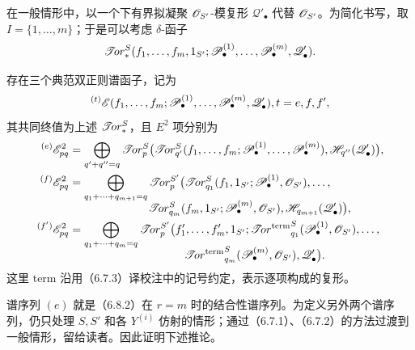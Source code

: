 在一般情形中，以一个下有界拟凝聚 $\mathscr O_{S'}$-模复形 $\mathscr Q'_\bullet$ 代替 $\mathscr O_{S'}$。为简化书写，取 $I=\{1,\ldots,m\}$；于是可以考虑 $\delta$-函子
\[
 \mathscr{T}\!or_*^S(f_1,\ldots,f_m,1_{S'};
         \mathscr P^{(1)}_\bullet,\ldots,\mathscr P^{(m)}_\bullet,\mathscr Q'_\bullet).
\]

存在三个典范双正则谱函子，记为
\[
 {}^{(t)}\mathscr E(f_1,\ldots,f_m;
       \mathscr P^{(1)}_\bullet,\ldots,\mathscr P^{(m)}_\bullet,\mathscr Q'_\bullet),
  t=e,f,f',
\]
其共同终值为上述 $\mathscr{T}\!or_*^S$，且 $E^2$ 项分别为
\begin{align*}
 {}^{(e)}\spE^2_{pq}
 &=\bigoplus_{q'+q''=q}\lTor_p^S\bigl(
   \lTor_{q'}^S(f_1,\ldots,f_m;
       \mathscr P^{(1)}_\bullet,\ldots,\mathscr P^{(m)}_\bullet),
       \HH_{q''}(\mathscr Q'_\bullet)\bigr),\\
 {}^{(f)}\spE^2_{pq}
 &=\bigoplus_{q_1+\cdots+q_{m+1}=q}\lTor_p^{S'}\bigl(
   \lTor_{q_1}^S(f_1,1_{S'};\mathscr P^{(1)}_\bullet,\OO_{S'}),\ldots,\\[-.6em]
 &\hspace{7em}\lTor_{q_m}^S(f_m,1_{S'};\mathscr P^{(m)}_\bullet,\OO_{S'}),
      \HH_{q_{m+1}}(\mathscr Q'_\bullet)\bigr),\\
 {}^{(f')}\spE^2_{pq}
 &=\bigoplus_{q_1+\cdots+q_m=q}\lTor_p^{S'}\bigl(
  f'_1,\ldots,f'_m,1_{S'};
  \termTor_{q_1}^{S}(\mathscr P^{(1)}_\bullet,\OO_{S'}),\ldots,\\[-.6em]
 &\hspace{10em}\termTor_{q_m}^{S}(\mathscr P^{(m)}_\bullet,\OO_{S'}),
  \mathscr Q'_\bullet\bigr).
\end{align*}
这里 $\mathrm{term}$ 沿用（6.7.3）译校注中的记号约定，表示逐项构成的复形。

谱序列 $(e)$ 就是（6.8.2）在 $r=m$ 时的结合性谱序列。为定义另外两个谱序列，仍只处理 $S,S'$ 和各 $Y^{(i)}$ 仿射的情形；通过（6.7.1）、（6.7.2）的方法过渡到一般情形，留给读者。因此证明下述推论。

